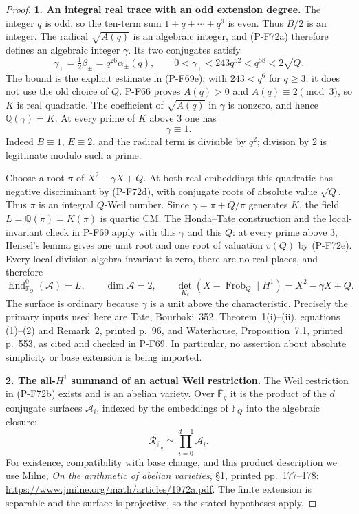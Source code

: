 \begin{proof}
\par\medskip\noindent\textbf{1. An integral real trace with an odd extension degree.}
The integer $q$ is odd, so the ten-term sum
$1+q+\cdots+q^9$ is even.  Thus $B/2$ is an integer.
The radical $\sqrt{A(q)}$ is an algebraic integer, and
(P-F72a) therefore defines an algebraic integer $\gamma$.
Its two conjugates satisfy
\[
       \gamma_\pm=\tfrac12\beta_\pm
                 =q^{26}\alpha_\pm(q),\qquad
       0<\gamma_\pm<243q^{52}<q^{58}<2\sqrt Q.                \tag{P-F72d}
\]
The bound is the explicit estimate in (P-F69e), with
$243<q^6$ for $q\ge3$; it does not use the old choice of $Q$.
P-F66 proves $A(q)>0$ and $A(q)\equiv2\pmod3$, so $K$ is
real quadratic.  The coefficient of $\sqrt{A(q)}$ in
$\gamma$ is nonzero, and hence $\mathbb Q(\gamma)=K$.
At every prime of $K$ above $3$ one has
\[
                         \gamma\equiv1.                     \tag{P-F72e}
\]
Indeed $B\equiv1$, $E\equiv2$, and the radical term is
divisible by $q^2$; division by $2$ is legitimate modulo
such a prime.

Choose a root $\pi$ of $X^2-\gamma X+Q$.
At both real embeddings this quadratic has negative
discriminant by (P-F72d), with conjugate roots of absolute
value $\sqrt Q$.  Thus $\pi$ is an integral $Q$-Weil number.
Since $\gamma=\pi+Q/\pi$ generates $K$, the field
$L=\mathbb Q(\pi)=K(\pi)$ is quartic CM.
The Honda--Tate construction and the local-invariant check
in P-F69 apply with this $\gamma$ and this $Q$: at every
prime above $3$, Hensel's lemma gives one unit root and
one root of valuation $v(Q)$ by (P-F72e).  Every local
division-algebra invariant is zero, there are no real
places, and therefore
\[
 \operatorname{End}_{\mathbb F_Q}^0(\mathcal A)=L,
 \qquad \dim\mathcal A=2,
 \qquad
 \det_{K_\ell}(X-\operatorname{Frob}_Q\mid H^1)=
                         X^2-\gamma X+Q.                    \tag{P-F72f}
\]
The surface is ordinary because $\gamma$ is a unit above
the characteristic.  Precisely the primary inputs used
here are Tate, Bourbaki~352, Theorem~1(i)--(ii), equations
(1)--(2) and Remark~2, printed p.~96, and Waterhouse,
Proposition~7.1, printed p.~553, as cited and checked in
P-F69.  In particular, no assertion about absolute
simplicity or base extension is being imported.

\par\medskip\noindent\textbf{2. The all-$H^1$ summand of an actual Weil restriction.}
The Weil restriction in (P-F72b) exists and is an abelian
variety.  Over $\overline{\mathbb F}_q$ it is the product
of the $d$ conjugate surfaces $\mathcal A_i$, indexed by
the embeddings of $\mathbb F_Q$ into the algebraic closure:
\[
             \mathcal R_{\overline{\mathbb F}_q}
                 \simeq\prod_{i=0}^{d-1}\mathcal A_i.
                                                               \tag{P-F72g}
\]
For existence, compatibility with base change, and this
product description we use Milne, \emph{On the arithmetic
of abelian varieties}, \S1, printed pp.~177--178:
\url{https://www.jmilne.org/math/articles/1972a.pdf}.
The finite extension is separable and the surface is
projective, so the stated hypotheses apply.


\end{proof}
